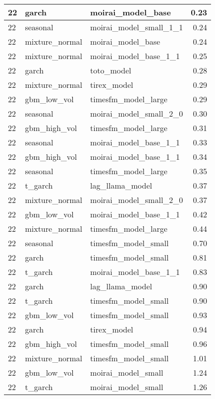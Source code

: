 {\begin{tabular}{lllr}
\midrule
22 & garch & moirai\_model\_base & 0.23 \\
\midrule
22 & seasonal & moirai\_model\_small\_1\_1 & 0.24 \\
\midrule
22 & mixture\_normal & moirai\_model\_base & 0.24 \\
\midrule
22 & mixture\_normal & moirai\_model\_base\_1\_1 & 0.25 \\
\midrule
22 & garch & toto\_model & 0.28 \\
\midrule
22 & mixture\_normal & tirex\_model & 0.29 \\
\midrule
22 & gbm\_low\_vol & timesfm\_model\_large & 0.29 \\
\midrule
22 & seasonal & moirai\_model\_small\_2\_0 & 0.30 \\
\midrule
22 & gbm\_high\_vol & timesfm\_model\_large & 0.31 \\
\midrule
22 & seasonal & moirai\_model\_base\_1\_1 & 0.33 \\
\midrule
22 & gbm\_high\_vol & moirai\_model\_base\_1\_1 & 0.34 \\
\midrule
22 & seasonal & timesfm\_model\_large & 0.35 \\
\midrule
22 & t\_garch & lag\_llama\_model & 0.37 \\
\midrule
22 & mixture\_normal & moirai\_model\_small\_2\_0 & 0.37 \\
\midrule
22 & gbm\_low\_vol & moirai\_model\_base\_1\_1 & 0.42 \\
\midrule
22 & mixture\_normal & timesfm\_model\_large & 0.44 \\
\midrule
22 & seasonal & timesfm\_model\_small & 0.70 \\
\midrule
22 & garch & timesfm\_model\_small & 0.81 \\
\midrule
22 & t\_garch & moirai\_model\_base\_1\_1 & 0.83 \\
\midrule
22 & garch & lag\_llama\_model & 0.90 \\
\midrule
22 & t\_garch & timesfm\_model\_small & 0.90 \\
\midrule
22 & gbm\_low\_vol & timesfm\_model\_small & 0.93 \\
\midrule
22 & garch & tirex\_model & 0.94 \\
\midrule
22 & gbm\_high\_vol & timesfm\_model\_small & 0.96 \\
\midrule
22 & mixture\_normal & timesfm\_model\_small & 1.01 \\
\midrule
22 & gbm\_low\_vol & moirai\_model\_small & 1.24 \\
\midrule
22 & t\_garch & moirai\_model\_small & 1.26 \\

\end{tabular}}
